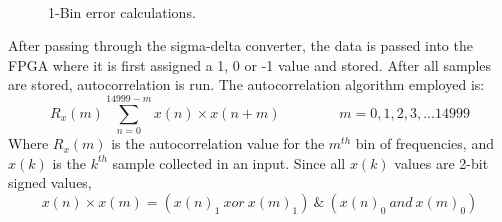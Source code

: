 \documentclass[aps,letterpaper,10pt]{revtex4}
\begin{document}
\begin{figure}[H]
  \centering
   \\                
  \caption{1-Bin error calculations.}
  \label{fig:error}
\end{figure}
After passing through the sigma-delta converter, the data is passed into the FPGA where it is first assigned a 1, 0 or -1 value and stored. After all samples are stored, autocorrelation is run. The autocorrelation algorithm employed is:
$$R_x(m) \sum_{n = 0}^{14999 - m}{x(n)\times x(n + m)~~~~~~~~~~~~~~~~~~~m = 0, 1, 2, 3, ... 14999}$$
Where $R_x(m)$ is the autocorrelation value for the $m^{th}$ bin of frequencies, and $x(k)$ is the $k^{th}$ sample collected in an input. Since all  $x(k)$ values are 2-bit signed values,  $$x(n)\times x(m) = (x(n)_1~xor~x(m)_1 )~\&~( x(n)_0~and~x(m)_0 )$$
\end{document}
